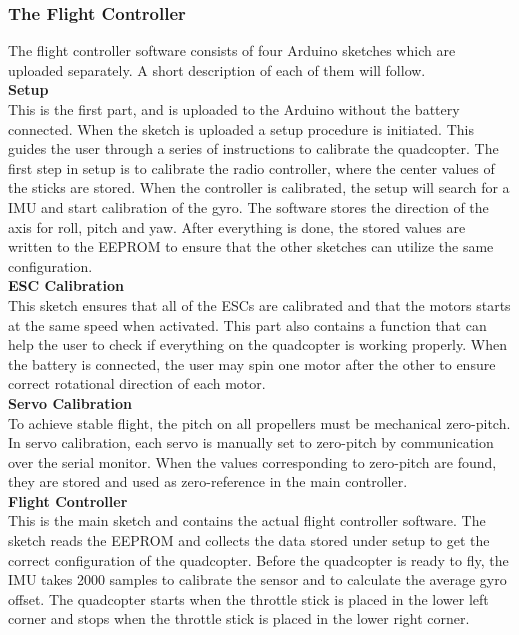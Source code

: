 \subsubsection{The Flight Controller}
The flight controller software consists of four Arduino sketches which are uploaded separately. A short description of each of them will follow.\\

\textbf{Setup}\\
This is the first part, and is uploaded to the Arduino without the battery connected. When the sketch is uploaded a setup procedure is initiated. This guides the user through a series of instructions to calibrate the quadcopter. The first step in setup is to calibrate the radio controller, where the center values of the sticks are stored.
When the controller is calibrated, the setup will search for a IMU and start calibration of the gyro. The software stores the direction of the axis for roll, pitch and yaw. After everything is done, the stored values are written to the EEPROM to ensure that the other sketches can utilize the same configuration. \\ 

\textbf{ESC Calibration}\\
This sketch ensures that all of the ESCs are calibrated and that the motors starts at the same speed when activated. This part also contains a function that can help the user to check if everything on the quadcopter is working properly. When the battery is connected, the user may spin one motor after the other to ensure correct rotational direction of each motor.  \\

\textbf{Servo Calibration}\\
To achieve stable flight, the pitch on all propellers must be mechanical zero-pitch. In servo calibration, each servo is manually set to zero-pitch by communication over the serial monitor. When the values corresponding to zero-pitch are found, they are stored and used as zero-reference in the main controller. \\

\textbf{Flight Controller}\\
This is the main sketch and contains the actual flight controller software. The sketch reads the EEPROM and collects the data stored under setup to get the correct configuration of the quadcopter. Before the quadcopter is ready to fly, the IMU takes 2000 samples to calibrate the sensor and to calculate the average gyro offset. The quadcopter starts when the throttle stick is placed in the lower left corner and stops when the throttle stick is placed in the lower right corner. \\


